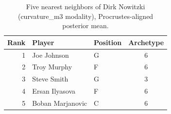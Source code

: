 \begin{table}[htbp]
  \centering\small
  \begin{tabular}{rllc}
    \toprule
    Rank & Player & Position & Archetype \\
    \midrule
    1 & Joe Johnson & G & 6 \\
    2 & Troy Murphy & F & 6 \\
    3 & Steve Smith & G & 3 \\
    4 & Ersan Ilyasova & F & 6 \\
    5 & Boban Marjanovic & C & 6 \\
    \bottomrule
  \end{tabular}
  \caption{Five nearest neighbors of Dirk Nowitzki (curvature_m3 modality), Procrustes-aligned posterior mean.}
  \label{tab:Dirk_Nowitzki_neighbors_curvature_m3}
\end{table}


